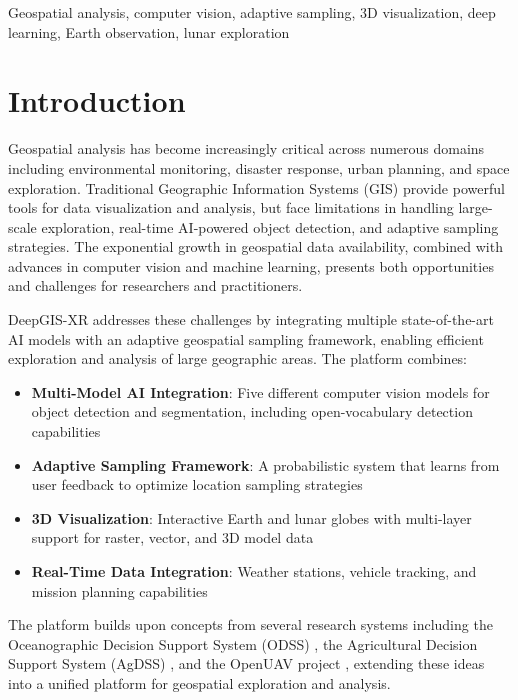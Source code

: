 \documentclass[conference]{IEEEtran}
\begin{document}
\begin{IEEEkeywords}
Geospatial analysis, computer vision, adaptive sampling, 3D visualization, deep learning, Earth observation, lunar exploration
\end{IEEEkeywords}

\section{Introduction}

Geospatial analysis has become increasingly critical across numerous domains including environmental monitoring, disaster response, urban planning, and space exploration. Traditional Geographic Information Systems (GIS) provide powerful tools for data visualization and analysis, but face limitations in handling large-scale exploration, real-time AI-powered object detection, and adaptive sampling strategies. The exponential growth in geospatial data availability, combined with advances in computer vision and machine learning, presents both opportunities and challenges for researchers and practitioners.

DeepGIS-XR addresses these challenges by integrating multiple state-of-the-art AI models with an adaptive geospatial sampling framework, enabling efficient exploration and analysis of large geographic areas. The platform combines:

\begin{itemize}
    \item \textbf{Multi-Model AI Integration}: Five different computer vision models for object detection and segmentation, including open-vocabulary detection capabilities
    \item \textbf{Adaptive Sampling Framework}: A probabilistic system that learns from user feedback to optimize location sampling strategies
    \item \textbf{3D Visualization}: Interactive Earth and lunar globes with multi-layer support for raster, vector, and 3D model data
    \item \textbf{Real-Time Data Integration}: Weather stations, vehicle tracking, and mission planning capabilities
\end{itemize}

The platform builds upon concepts from several research systems including the Oceanographic Decision Support System (ODSS) \cite{odss_ref}, the Agricultural Decision Support System (AgDSS) \cite{agdss_ref}, and the OpenUAV project \cite{openuav_ref}, extending these ideas into a unified platform for geospatial exploration and analysis.
\end{document}
